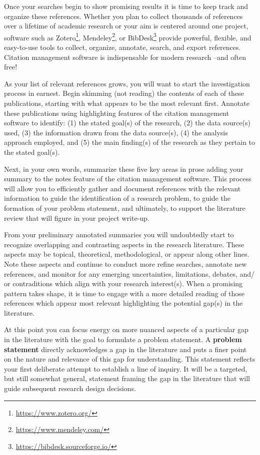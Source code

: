 \documentclass[
  letterpaper,
  krantz1]{latex/krantz-mod}
\theoremstyle{definition}
\theoremstyle{definition}
\theoremstyle{remark}
\DeclareRobustCommand{\href}[2]{#2\footnote{\url{#1}}}
\begin{document}
Once your searches begin to show promising results it is time to keep
track and organize these references. Whether you plan to collect
thousands of references over a lifetime of academic research or your aim
is centered around one project, software such as
\href{https://www.zotero.org/}{Zotero},
\href{https://www.mendeley.com/}{Mendeley}, or
\href{https://bibdesk.sourceforge.io/}{BibDesk} provide powerful,
flexible, and easy-to-use tools to collect, organize, annotate, search,
and export references. Citation management software is indispensable for
modern research --and often free!

As your list of relevant references grows, you will want to start the
investigation process in earnest. Begin skimming (not reading) the
contents of each of these publications, starting with what appears to be
the most relevant first. Annotate these publications using highlighting
features of the citation management software to identify: (1) the stated
goal(s) of the research, (2) the data source(s) used, (3) the
information drawn from the data source(s), (4) the analysis approach
employed, and (5) the main finding(s) of the research as they pertain to
the stated goal(s).

Next, in your own words, summarize these five key areas in prose adding
your summary to the notes feature of the citation management software.
This process will allow you to efficiently gather and document
references with the relevant information to guide the identification of
a research problem, to guide the formation of your problem statement,
and ultimately, to support the literature review that will figure in
your project write-up.

From your preliminary annotated summaries you will undoubtedly start to
recognize overlapping and contrasting aspects in the research
literature. These aspects may be topical, theoretical, methodological,
or appear along other lines. Note these aspects and continue to conduct
more refine searches, annotate new references, and monitor for any
emerging uncertainties, limitations, debates, and/ or contraditions
which align with your research interest(s). When a promising pattern
takes shape, it is time to engage with a more detailed reading of those
references which appear most relevant highlighting the potential gap(s)
in the literature.

At this point you can focus energy on more nuanced aspects of a
particular gap in the literature with the goal to formulate a problem
statement. A \textbf{problem statement} directly acknowledges a gap in
the literature and puts a finer point on the nature and relevance of
this gap for understanding. This statement reflects your first
deliberate attempt to establish a line of inquiry. It will be a
targeted, but still somewhat general, statement framing the gap in the
literature that will guide subsequent research design decisions.
\end{document}
